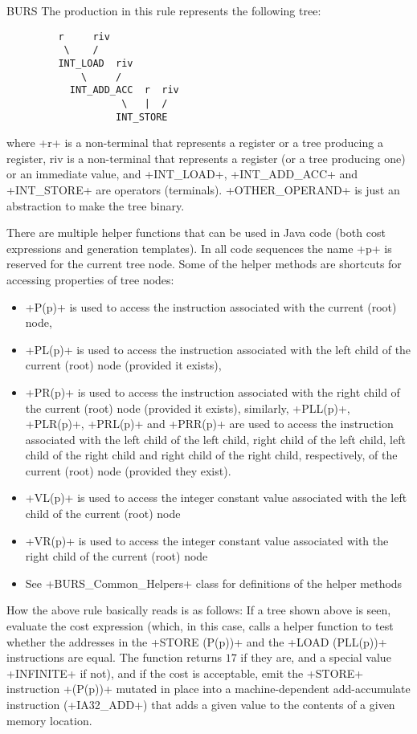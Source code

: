 \begin{subsection}{BURS}
The production in this rule represents the following tree:
\begin{lstlisting}
         r     riv
          \    /
         INT_LOAD  riv
             \     /
           INT_ADD_ACC  r  riv
                    \   |  /
                   INT_STORE
\end{lstlisting}

where \spverb+r+ is a non-terminal that represents a register or a tree producing a register, riv is a non-terminal that represents a register (or a tree producing one) or an immediate value, and \spverb+INT_LOAD+, \spverb+INT_ADD_ACC+ and \spverb+INT_STORE+ are operators (terminals). \spverb+OTHER_OPERAND+ is just an abstraction to make the tree binary.

There are multiple helper functions that can be used in Java code (both cost expressions and generation templates). In all code sequences the name \spverb+p+ is reserved for the current tree node. Some of the helper methods are shortcuts for accessing properties of tree nodes:
\begin{itemize}
  \item \spverb+P(p)+ is used to access the instruction associated with the current (root) node,
  \item \spverb+PL(p)+ is used to access the instruction associated with the left child of the current (root) node (provided it exists),
  \item \spverb+PR(p)+ is used to access the instruction associated with the right child of the current (root) node (provided it exists),
    similarly,  \spverb+PLL(p)+,  \spverb+PLR(p)+,  \spverb+PRL(p)+ and  \spverb+PRR(p)+ are used to access the instruction associated with the left child of the left child, right child of the left child, left child of the right child and right child of the right child, respectively, of the current (root) node (provided they exist).
  \item \spverb+VL(p)+ is used to access the integer constant value associated with the left child of the current (root) node
  \item \spverb+VR(p)+ is used to access the integer constant value associated with the right child of the current (root) node
  \item See \spverb+BURS_Common_Helpers+ class for definitions of the helper methods
\end{itemize}

How the above rule basically reads is as follows:
If a tree shown above is seen, evaluate the cost expression (which, in this case, calls a helper function to test whether the addresses in the \spverb+STORE (P(p))+ and the \spverb+LOAD (PLL(p))+ instructions are equal. The function returns $17$ if they are, and a special value \spverb+INFINITE+ if not), and if the cost is acceptable, emit the \spverb+STORE+ instruction \spverb+(P(p))+ mutated in place into a machine-dependent add-accumulate instruction (\spverb+IA32_ADD+) that adds a given value to the contents of a given memory location.


\end{subsection}
